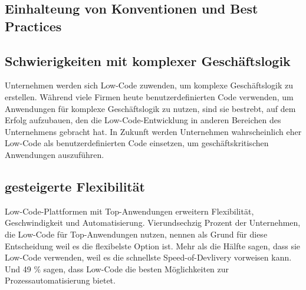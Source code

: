 \documentclass[12pt]{article} %
\begin{document}
	
	
	
	
	\subsection{Einhalteung von Konventionen und Best Practices}
	
	\subsection{Schwierigkeiten mit komplexer Geschäftslogik}
	Unternehmen werden sich Low-Code zuwenden, um komplexe Geschäftslogik zu erstellen.
	Während viele Firmen heute benutzerdefinierten Code verwenden, um Anwendungen für komplexe
	Geschäftslogik zu nutzen, sind sie bestrebt, auf dem Erfolg aufzubauen, den die Low-Code-Entwicklung in anderen Bereichen des Unternehmens gebracht hat. In Zukunft werden Unternehmen wahrscheinlich eher Low-Code als benutzerdefinierten Code einsetzen, um geschäftskritischen Anwendungen auszuführen. \cite{EmmaVanPelt.2019}
	
	\subsection{gesteigerte Flexibilität}
	Low-Code-Plattformen mit Top-Anwendungen erweitern Flexibilität, Geschwindigkeit und Automatisierung. Vierundsechzig Prozent der Unternehmen, die Low-Code für Top-Anwendungen nutzen, nennen als Grund für diese Entscheidung weil es die flexibelste Option ist. 
	Mehr als die Hälfte sagen, dass sie Low-Code verwenden, weil es die schnellste Speed-of-Devlivery vorweisen kann. Und 49 \% sagen, dass Low-Code die besten Möglichkeiten zur Prozessautomatisierung bietet. \cite{EmmaVanPelt.2019}
	
\end{document}
